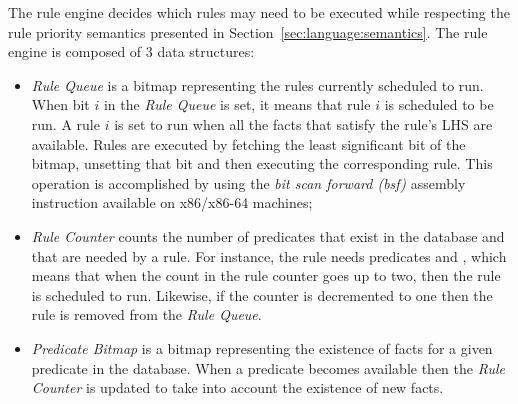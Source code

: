 The rule engine decides which rules may need to be executed while respecting the
rule priority semantics presented in Section~\ref{sec:language:semantics}. The
rule engine is composed of 3 data structures:

\begin{itemize}

   \item \emph{Rule Queue} is a bitmap representing the rules currently
      scheduled to run. When bit $i$ in the \emph{Rule Queue} is set, it
      means that rule $i$ is scheduled to be run. A rule $i$ is set to run
      when all the facts that satisfy the rule's LHS are available.
      Rules are executed by fetching the least significant bit of
      the bitmap, unsetting that bit and then executing the corresponding rule.
      This operation is accomplished by using the \emph{bit scan forward (bsf)}
      assembly instruction available on x86/x86-64 machines;

   \item \emph{Rule Counter} counts the number of predicates that exist in the
      database and that are needed by a rule. For instance, the rule  needs predicates  and , which means that when
      the count in the rule counter goes up to two, then the rule is scheduled
      to run. Likewise, if the counter is decremented to one then the rule is
      removed from the \emph{Rule Queue}.

   \item \emph{Predicate Bitmap} is a bitmap representing the existence of facts
      for a given predicate in the database. When a predicate becomes available
      then the \emph{Rule Counter} is updated to take into account the existence
      of new facts.

\end{itemize}


